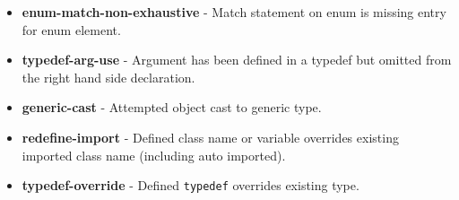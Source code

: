 \documentclass[conc-doc]{subfiles}
\begin{document}
\begin{itemize}
	\item \textbf{enum-match-non-exhaustive} - Match statement on enum is missing entry for enum element.
	\item \textbf{typedef-arg-use} - Argument has been defined in a typedef but omitted from the right hand side declaration.
	\item \textbf{generic-cast} - Attempted object cast to generic type.
	\item \textbf{redefine-import} - Defined class name or variable overrides existing imported class name (including auto imported).
	\item \textbf{typedef-override} - Defined \lstinline{typedef} overrides existing type.	
\end{itemize}
\end{document}
